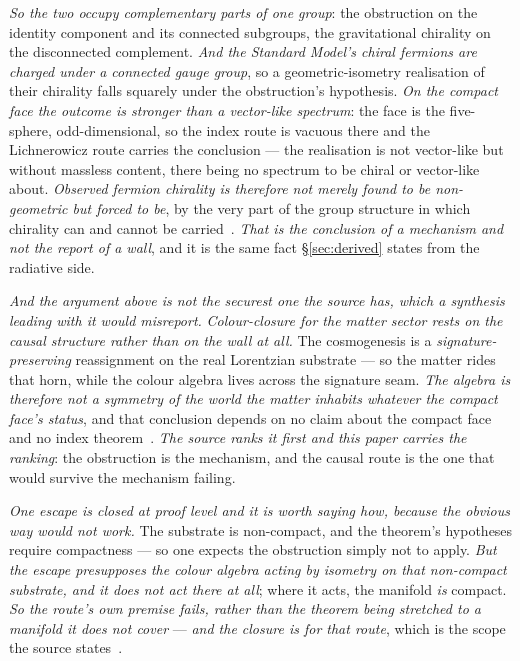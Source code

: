 \documentclass[11pt,a4paper]{article}
\theoremstyle{plain}
\theoremstyle{definition}
\begin{document}
\emph{So the two occupy complementary parts of one group}: the obstruction on the identity component and its
connected subgroups, the gravitational chirality on the disconnected complement. \emph{And the Standard
Model's chiral fermions are charged under a connected gauge group}, so a geometric-isometry realisation of
their chirality falls squarely under the obstruction's hypothesis. \emph{On the compact face the outcome
is stronger than a vector-like spectrum}: the face is the five-sphere, odd-dimensional, so the index route is
vacuous there and the Lichnerowicz route carries the conclusion --- the realisation is not vector-like but
without massless content, there being no spectrum to be chiral or vector-like about. \emph{Observed fermion chirality is therefore not merely found to be non-geometric but forced to
be}, by the very part of the group structure in which chirality can and cannot be
carried~\cite{JanzenBoundary}. \emph{That is the conclusion of a mechanism and not the report of a wall}, and
it is the same fact \S\ref{sec:derived} states from the radiative side.

\emph{And the argument above is not the securest one the source has, which a synthesis leading with it would
misreport.} \emph{Colour-closure for the matter sector rests on the causal structure rather than on the wall
at all.} The cosmogenesis is a \emph{signature-preserving} reassignment on the real Lorentzian substrate ---
so the matter rides that horn, while the colour algebra lives across the signature seam. \emph{The algebra is
therefore not a symmetry of the world the matter inhabits whatever the compact face's status}, and that
conclusion depends on no claim about the compact face and no index theorem~\cite{JanzenBoundary}. \emph{The
source ranks it first and this paper carries the ranking}: the obstruction is the mechanism, and the causal
route is the one that would survive the mechanism failing.

\emph{One escape is closed at proof level and it is worth saying how, because the obvious way would not
work.} The substrate is non-compact, and the theorem's hypotheses require compactness --- so one expects the
obstruction simply not to apply. \emph{But the escape presupposes the colour algebra acting by isometry on
that non-compact substrate, and it does not act there at all}; where it acts, the manifold \emph{is}
compact. \emph{So the route's own premise fails, rather than the theorem being stretched to a manifold it
does not cover} --- \emph{and the closure is for that route}, which is the scope the source
states~\cite{JanzenBoundary}.
\end{document}
